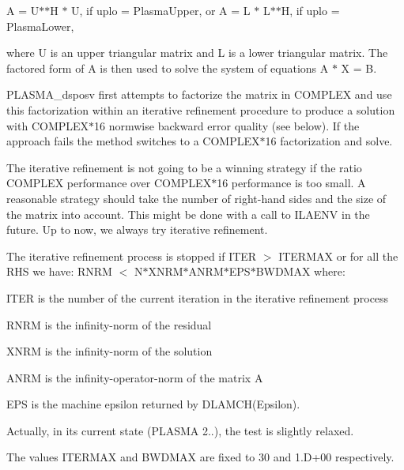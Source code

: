 A = U$\ast$$\ast$\+H $\ast$ U, if uplo = Plasma\+Upper, or A = L $\ast$ L$\ast$$\ast$\+H, if uplo = Plasma\+Lower,

where U is an upper triangular matrix and L is a lower triangular matrix. The factored form of A is then used to solve the system of equations A $\ast$ X = B.

P\+L\+A\+S\+M\+A\+\_\+dsposv first attempts to factorize the matrix in C\+O\+M\+P\+L\+E\+X and use this factorization within an iterative refinement procedure to produce a solution with C\+O\+M\+P\+L\+E\+X$\ast$16 normwise backward error quality (see below). If the approach fails the method switches to a C\+O\+M\+P\+L\+E\+X$\ast$16 factorization and solve.

The iterative refinement is not going to be a winning strategy if the ratio C\+O\+M\+P\+L\+E\+X performance over C\+O\+M\+P\+L\+E\+X$\ast$16 performance is too small. A reasonable strategy should take the number of right-\/hand sides and the size of the matrix into account. This might be done with a call to I\+L\+A\+E\+N\+V in the future. Up to now, we always try iterative refinement.

The iterative refinement process is stopped if I\+T\+E\+R $>$ I\+T\+E\+R\+M\+A\+X or for all the R\+H\+S we have\+: R\+N\+R\+M $<$ N$\ast$\+X\+N\+R\+M$\ast$\+A\+N\+R\+M$\ast$\+E\+P\+S$\ast$\+B\+W\+D\+M\+A\+X where\+:


\begin{DoxyItemize}
\item I\+T\+E\+R is the number of the current iteration in the iterative refinement process
\item R\+N\+R\+M is the infinity-\/norm of the residual
\item X\+N\+R\+M is the infinity-\/norm of the solution
\item A\+N\+R\+M is the infinity-\/operator-\/norm of the matrix A
\item E\+P\+S is the machine epsilon returned by D\+L\+A\+M\+C\+H(\textquotesingle{}Epsilon\textquotesingle{}).
\end{DoxyItemize}

Actually, in its current state (P\+L\+A\+S\+M\+A 2..), the test is slightly relaxed.

The values I\+T\+E\+R\+M\+A\+X and B\+W\+D\+M\+A\+X are fixed to 30 and 1.\+D+00 respectively.


